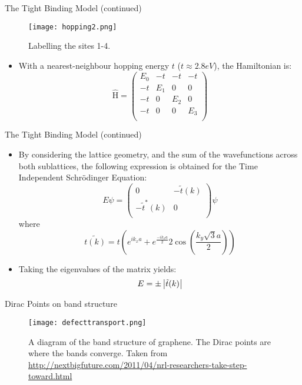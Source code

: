 \documentclass{beamer}
\begin{document}
\begin{frame}[t]{The Tight Binding Model (continued)}

\begin{figure}[c]
\texttt{[image: hopping2.png]}
\caption{Labelling the sites 1-4.}
\end{figure}
\begin{itemize}
\item With a nearest-neighbour hopping energy $t$ ($t \approx 2.8eV$), the Hamiltonian is:
\begin{equation}
\hat {\text{H}} = \left ( \begin{array}{cccc}
E_0 & -t & -t & -t\\
-t & E_1 & 0 & 0\\
-t & 0 & E_2 & 0\\
-t & 0 & 0 & E_3\\
\end{array}
\right )
\end{equation}
\end{itemize}
\end{frame}

\begin{frame}[t]{The Tight Binding Model (continued)}
\begin{itemize}
\item By considering the lattice geometry, and the sum of the wavefunctions across both sublattices, the following expression is obtained for the Time Independent Schr\"{o}dinger Equation:
\begin{equation}
E \psi = \left ( \begin{array}{cc}
0 & -\tilde t(k)\\
-\tilde t^* (k) & 0\\
\end{array} \right ) \psi
\end{equation}
where
\begin{equation}
\tilde{t(k)}=t\left ( e^{ik_x a} + e^{\frac{-ik_x a}{2}} 2\cos\left(\frac{k_y \sqrt{3}a}{2} \right ) \right )
\end{equation}
\item Taking the eigenvalues of the matrix yields:
\begin{equation}
E = \pm \left | \tilde t(k)\right |
\end{equation}
\end{itemize}
\end{frame}

\begin{frame}[t]{Dirac Points on band structure}
\begin{figure}
\texttt{[image: defecttransport.png]}
\caption{A diagram of the band structure of graphene. The Dirac points are where the bands converge. Taken from \url{http://nextbigfuture.com/2011/04/nrl-researchers-take-step-toward.html}}
\end{figure}
\end{frame}
\end{document}

